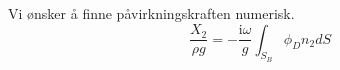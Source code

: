 Vi ønsker å finne påvirkningskraften numerisk. 
\begin{equation}
\frac{X_2}{\rho g}  =  -  \frac{\mathrm{i} \omega}{g}\int_{S_B}   \phi_D n_2dS
\end{equation}

